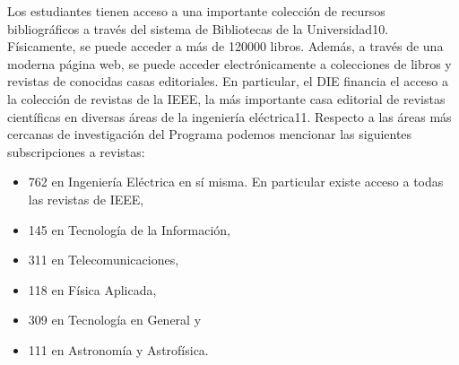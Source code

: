 Los estudiantes tienen acceso a una importante colección de recursos bibliográficos a través del
sistema de Bibliotecas de la Universidad10. Físicamente, se puede acceder a más de 120000 libros.
Además, a través de una moderna página web, se puede acceder electrónicamente a colecciones
de libros y revistas de conocidas casas editoriales. En particular, el DIE financia el acceso a la
colección de revistas de la IEEE, la más importante casa editorial de revistas científicas en diversas
áreas de la ingeniería eléctrica11. Respecto a las áreas más cercanas de investigación del Programa
podemos mencionar las siguientes subscripciones a revistas:

\begin{itemize}
\item 762 en Ingeniería Eléctrica en sí misma. En particular existe acceso a todas las revistas de
IEEE,
\item 145 en Tecnología de la Información,
\item 311 en Telecomunicaciones,
\item 118 en Física Aplicada,
\item 309 en Tecnología en General y
\item 111 en Astronomía y Astrofísica.
\end{itemize}




